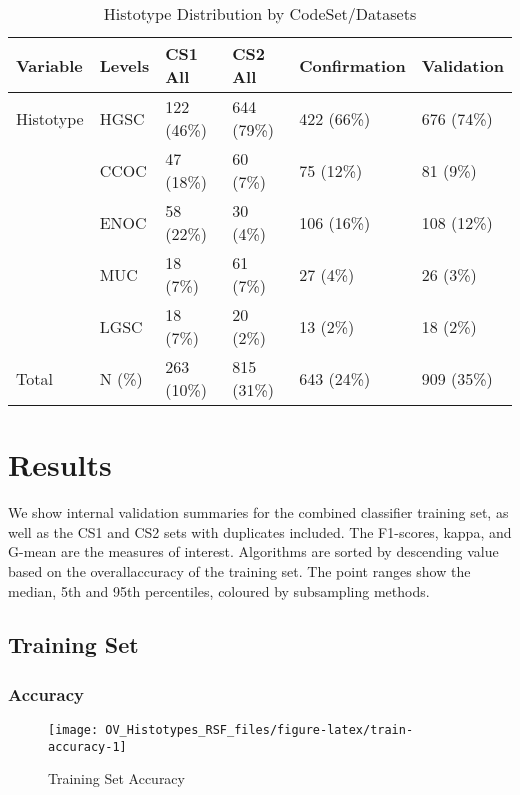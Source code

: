\documentclass[
]{report}
\begin{document}
\begin{table}

\caption{\label{tab:hist-codeset-dataset}Histotype Distribution by CodeSet/Datasets}
\centering
\begin{tabular}[t]{l|l|l|l|l|l}
\hline
Variable & Levels & CS1 All & CS2 All & Confirmation & Validation\\
\hline
Histotype & HGSC & 122 (46\%) & 644 (79\%) & 422 (66\%) & 676 (74\%)\\
\hline
 & CCOC & 47 (18\%) & 60 (7\%) & 75 (12\%) & 81 (9\%)\\
\hline
 & ENOC & 58 (22\%) & 30 (4\%) & 106 (16\%) & 108 (12\%)\\
\hline
 & MUC & 18 (7\%) & 61 (7\%) & 27 (4\%) & 26 (3\%)\\
\hline
 & LGSC & 18 (7\%) & 20 (2\%) & 13 (2\%) & 18 (2\%)\\
\hline
Total & N (\%) & 263 (10\%) & 815 (31\%) & 643 (24\%) & 909 (35\%)\\
\hline
\end{tabular}
\end{table}

\hypertarget{results}{%
\chapter{Results}\label{results}}

We show internal validation summaries for the combined classifier training set, as well as the CS1 and CS2 sets with duplicates included. The F1-scores, kappa, and G-mean are the measures of interest. Algorithms are sorted by descending value based on the overallaccuracy of the training set. The point ranges show the median, 5th and 95th percentiles, coloured by subsampling methods.

\hypertarget{training-set}{%
\section{Training Set}\label{training-set}}

\hypertarget{accuracy}{%
\subsection{Accuracy}\label{accuracy}}

\begin{figure}[H]

{\centering \texttt{[image: OV\_Histotypes\_RSF\_files/figure-latex/train-accuracy-1]} 

}

\caption{Training Set Accuracy}\label{fig:train-accuracy}
\end{figure}
\end{document}
